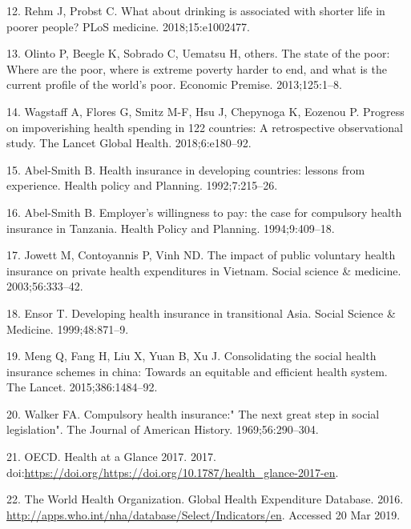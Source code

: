 \documentclass[]{elsarticle} %
\begin{document}
\leavevmode\hypertarget{ref-rehm2018drinking}{}%
12. Rehm J, Probst C. What about drinking is associated with shorter life in poorer people? PLoS medicine. 2018;15:e1002477.

\leavevmode\hypertarget{ref-olinto2013state}{}%
13. Olinto P, Beegle K, Sobrado C, Uematsu H, others. The state of the poor: Where are the poor, where is extreme poverty harder to end, and what is the current profile of the world's poor. Economic Premise. 2013;125:1--8.

\leavevmode\hypertarget{ref-wagstaff2018progress}{}%
14. Wagstaff A, Flores G, Smitz M-F, Hsu J, Chepynoga K, Eozenou P. Progress on impoverishing health spending in 122 countries: A retrospective observational study. The Lancet Global Health. 2018;6:e180--92.

\leavevmode\hypertarget{ref-abel1992health}{}%
15. Abel-Smith B. Health insurance in developing countries: lessons from experience. Health policy and Planning. 1992;7:215--26.

\leavevmode\hypertarget{ref-abel1994employer}{}%
16. Abel-Smith B. Employer's willingness to pay: the case for compulsory health insurance in Tanzania. Health Policy and Planning. 1994;9:409--18.

\leavevmode\hypertarget{ref-jowett2003impact}{}%
17. Jowett M, Contoyannis P, Vinh ND. The impact of public voluntary health insurance on private health expenditures in Vietnam. Social science \& medicine. 2003;56:333--42.

\leavevmode\hypertarget{ref-ensor1999developing}{}%
18. Ensor T. Developing health insurance in transitional Asia. Social Science \& Medicine. 1999;48:871--9.

\leavevmode\hypertarget{ref-meng2015consolidating}{}%
19. Meng Q, Fang H, Liu X, Yuan B, Xu J. Consolidating the social health insurance schemes in china: Towards an equitable and efficient health system. The Lancet. 2015;386:1484--92.

\leavevmode\hypertarget{ref-walker1969compulsory}{}%
20. Walker FA. Compulsory health insurance:" The next great step in social legislation". The Journal of American History. 1969;56:290--304.

\leavevmode\hypertarget{ref-healthglance2017}{}%
21. OECD. Health at a Glance 2017. 2017. doi:\href{https://doi.org/https://doi.org/https://doi.org/10.1787/health_glance-2017-en}{https://doi.org/https://doi.org/10.1787/health\_glance-2017-en}.

\leavevmode\hypertarget{ref-WHOdata}{}%
22. The World Health Organization. Global Health Expenditure Database. 2016. \url{http://apps.who.int/nha/database/Select/Indicators/en}. Accessed 20 Mar 2019.
\end{document}
